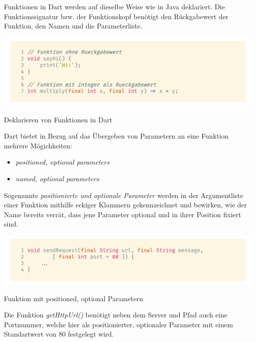 Funktionen in Dart werden auf dieselbe Weise wie in Java deklariert. Die Funktionssignatur bzw. der Funktionskopf benötigt den Rückgabewert der Funktion, den Namen und die Parameterliste.

\begin{code}[H]
    \centering
    \includegraphics[width=1\textwidth]{images/Dart/theory/dartFunctions.png}
    \vspace{-25pt}
    \caption{Deklarieren von Funktionen in Dart}
\end{code}

Dart bietet in Bezug auf das Übergeben von Parametern an eine Funktion mehrere Mögichkeiten:

\begin{itemize}
    \item \textit{positioned, optional parameters}
    \item \textit{named, optional parameters}
\end{itemize}

Sogenannte \textit{positionierte und optionale Parameter} werden in der Argumentliste einer Funktion mithilfe eckiger Klammern gekennzeichnet und bewirken, wie der Name bereits verrät, dass jene Parameter optional und in ihrer Position fixiert sind.

\begin{code}[H]
    \centering
    \includegraphics[width=1\textwidth]{images/Dart/theory/dartPositionedArgumentsFunction.png}
    \vspace{-25pt}
    \caption{Funktion mit positioned, optional Parametern}
\end{code}

Die Funktion \textit{getHttpUrl()} benötigt neben dem Server und Pfad auch eine Portnummer, welche hier als positionierter, optionaler Parameter mit einem Standartwert von 80 festgelegt wird.

